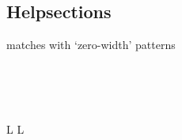 \subsection{Helpsections}	{}
	{matches with `zero-width'  patterns}


\\\\\\
\copyrightnotice


\vfil
\supereject
\if L\lr \else\null\vfill\eject\fi
\if L\lr \else\null\vfill\eject\fi
\bye

